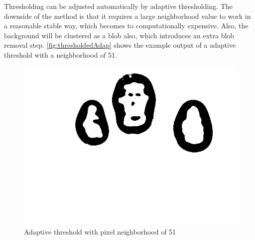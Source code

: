 Thresholding can be adjusted automatically by adaptive thresholding. The downside of the method is that it requires a large neighborhood value to work in a reasonable stable way, which becomes to computationally expensive. Also, the background will be clustered as a blob also, which introduces an extra blob removal step. \autoref{fig:thresholdedAdap} shows the example output of a adaptive threshold with a neighborhood of 51.


\begin{figure}[htbp]
\center{}
\includegraphics[width=0.3\linewidth]{figures/pipeline/thresholdedAdap.jpg}
\caption{Adaptive threshold with pixel neighborhood of 51}
\label{fig:thresholdedAdap}
\end{figure}






